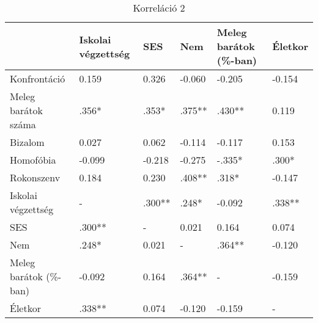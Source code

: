 \begin{table}[h]
	\begin{tabular}{@{}lp{2cm}p{2cm}lp{2cm}l@{}}
		\toprule
		& Iskolai végzettség & SES & Nem    & Meleg barátok (\%-ban) & Életkor \\ \midrule
		Konfrontáció            & 0.159              & 0.326                   & -0.060 & -0.205                 & -0.154  \\
		Meleg barátok száma     & .356*              & .353*                   & .375** & .430**                 & 0.119   \\
		Bizalom                 & 0.027              & 0.062                   & -0.114 & -0.117                 & 0.153   \\
		Homofóbia               & -0.099             & -0.218                  & -0.275 & -.335*                 & .300*   \\
		Rokonszenv              & 0.184              & 0.230                   & .408** & .318*                  & -0.147  \\
		Iskolai végzettség      & -                  & .300**                  & .248*  & -0.092                 & .338**  \\
		SES & .300**             & -                       & 0.021  & 0.164                  & 0.074   \\
		Nem                     & .248*              & 0.021                   & -      & .364**                 & -0.120  \\
		Meleg barátok (\%-ban)  & -0.092             & 0.164                   & .364** & -                      & -0.159  \\
		Életkor                 & .338**             & 0.074                   & -0.120 & -0.159                 & -       \\ \bottomrule
	\end{tabular}
	\caption{Korreláció 2}
	\label{table:3}
\end{table}

